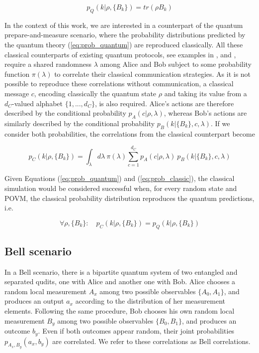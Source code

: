 \begin{equation}\label{eq:prob_quantum}
p_Q(k|\rho,\{B_{k}\}) = tr(\rho B_{k})
\end{equation}

In the context of this work, we are interested in a counterpart of the quantum prepare-and-measure scenario, where the probability distributions predicted by the quantum theory (\ref{eq:prob_quantum}) are reproduced classically. All these classical counterparts of existing quantum protocols, see examples in \cite{cerf2000}, \cite{toner2003} and \cite{renner2023}, require a shared randomness $\lambda$ among Alice and Bob subject to some probability function $\pi(\lambda)$ to correlate their classical communication strategies. As it is not possible to reproduce these correlations without communication, a classical message $c$, encoding classically the quantum state $\rho$ and taking its value from a $d_C$-valued alphabet $\{1,...,d_C\}$, is also required. Alice's actions are therefore described by the conditional probability $p_A(c|\rho,\lambda)$, whereas Bob's actions are similarly described by the conditional probability $p_B(k|\{B_{k}\},c,\lambda)$. If we consider both probabilities, the correlations from the classical counterpart become

\begin{equation}\label{eq:prob_classic}
p_C(k|\rho,\{B_{k}\}) = \int_{\lambda} d\lambda\ \pi(\lambda) \sum_{c=1}^{d_C} p_A(c|\rho, \lambda)\ p_B(k|\{B_{k}\}, c, \lambda)
\end{equation}

Given Equations (\ref{eq:prob_quantum}) and (\ref{eq:prob_classic}), the classical simulation would be considered successful when, for every random state and POVM, the classical probability distribution reproduces the quantum predictions, i.e.

\begin{equation}\label{eq:prob_classic_quantum}
\forall \rho, \{B_{k}\}:\quad p_C(k|\rho,\{B_{k}\}) = p_Q(k|\rho,\{B_{k}\})
\end{equation}

\subsection{Bell scenario}
In a Bell scenario, there is a bipartite quantum system of two entangled and separated qudits, one with Alice and another one with Bob. 
Alice chooses a random local measurement $A_x$ among two possible observables $\{A_0, A_1\}$, and produces an output $a_x$ according to the distribution of her measurement elements. Following the same procedure, Bob chooses his own random local measurement $B_y$ among two possible observables $\{B_0, B_1\}$, and produces an outcome $b_y$. Even if both outcomes appear random, their joint probabilities $p_{A_x,B_y}(a_x, b_y)$ are correlated. We refer to these correlations as Bell correlations. 

